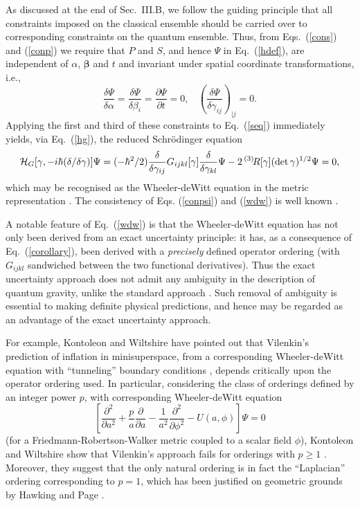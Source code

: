 \documentclass[a4paper,preprint, showpacs, aps, draft]{revtex4}
\begin{document}
{{As discussed at the end of Sec.~III.B, we follow the guiding
principle that all constraints imposed on the classical ensemble should
be carried over to corresponding constraints on the quantum ensemble.  
Thus, from Eqs.~(\ref{cons}) and (\ref{conp}) we require that $P$ and
$S$, and hence $\Psi$ in Eq.~(\ref{hdef}), are independent of $\alpha$,
${\bm \beta}$ and $t$ and invariant under spatial coordinate
transformations, i.e., 
\begin{equation} \label{conpsi}
\frac{\delta \Psi}{\delta\alpha}= \frac{\delta \Psi}{\delta\beta_i} =
\frac{\partial \Psi}{\partial t} = 0,~~~~
\left(\frac{\delta \Psi}{\delta\gamma_{ij}}\right)_{| j}=0 .
\end{equation}
Applying the first and third of these constraints to Eq.~(\ref{seq})
immediately yields, via Eq.~(\ref{hg}),  
the reduced Schr\"{o}dinger equation
\begin{equation} \label{wdw}
{\cal H}_G[\gamma, -i\hbar(\delta/\delta \gamma)]\Psi = (-\hbar^2/2)
\frac{\delta}{\delta \gamma_{ij}}G_{ijkl}[\gamma]\frac{\delta
}{\delta \gamma_{kl}}\Psi - 2\,{}^{(3)}\!R[\gamma](\det\gamma)^{1/2}
\Psi = 0 ,
\end{equation} 
which may be recognised as  
the Wheeler-deWitt equation in the metric representation \cite{dw}. 
The consistency of Eqs.
(\ref{conpsi}) and (\ref{wdw}) is well known \cite{dw}. 

A notable feature of Eq.~(\ref{wdw}) is that the Wheeler-deWitt equation
has not only been derived from an exact uncertainty principle: it has, as 
a consequence of Eq.~(\ref{corollary}),
been derived with a {\it precisely}
defined operator ordering (with $G_{ijkl}$ sandwiched between the two
functional derivatives).
Thus the exact uncertainty approach does not admit
any ambiguity in the description of quantum gravity, unlike the standard
approach \cite{dw}.  Such removal of ambiguity is essential to
making definite physical predictions, and hence may be
regarded as an advantage of the exact uncertainty approach. 

For example, Kontoleon and Wiltshire \cite{wiltshire} have pointed
out that Vilenkin's prediction of inflation in minisuperspace,
from a corresponding Wheeler-deWitt equation with
``tunneling'' boundary conditions \cite{vilenkin},
depends critically upon the operator ordering used.
In particular, considering the class of orderings defined by an integer
power $p$, with corresponding
Wheeler-deWitt equation \cite{vilenkin}
\begin{equation} \label{vile}
\left[\frac{\partial^2}{\partial a^2} +
\frac{p}{a}\frac{\partial}{\partial a} - \frac{1}{a^2}\frac{\partial^2}{
\partial \phi^2} - U(a,\phi)\right]\Psi = 0 
\end{equation}
(for a Friedmann-Robertson-Walker metric coupled to a scalar field $\phi$), 
Kontoleon and Wiltshire show that Vilenkin's approach fails for orderings
with $p\geq 1$ \cite{wiltshire}.  Moreover, they suggest
that the only natural ordering is in fact the ``Laplacian'' ordering
corresponding to $p=1$, which has been justified on geometric grounds by
Hawking and Page \cite{hawking}.  

}}
\end{document}
